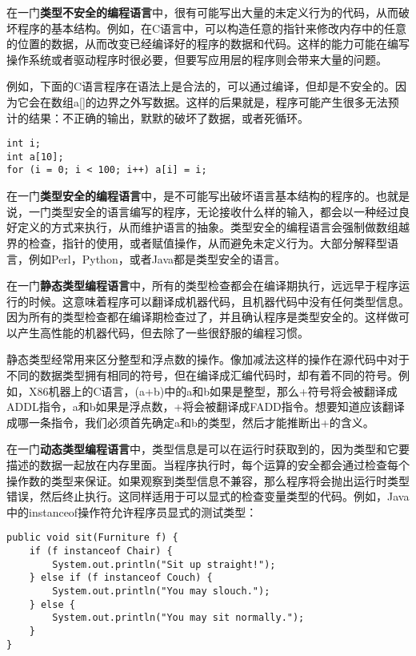 \documentclass[cn,11pt,chinese]{elegantbook}
\begin{document}
在一门\textbf{类型不安全的编程语言}中，很有可能写出大量的未定义行为的代码，从而破坏程序的基本结构。例如，在C语言中，可以构造任意的指针来修改内存中的任意的位置的数据，从而改变已经编译好的程序的数据和代码。这样的能力可能在编写操作系统或者驱动程序时很必要，但要写应用层的程序则会带来大量的问题。

例如，下面的C语言程序在语法上是合法的，可以通过编译，但却是不安全的。因为它会在数组a[]的边界之外写数据。这样的后果就是，程序可能产生很多无法预计的结果：不正确的输出，默默的破坏了数据，或者死循环。

\begin{verbatim}
int i;
int a[10];
for (i = 0; i < 100; i++) a[i] = i;
\end{verbatim}

在一门\textbf{类型安全的编程语言}中，是不可能写出破坏语言基本结构的程序的。也就是说，一门类型安全的语言编写的程序，无论接收什么样的输入，都会以一种经过良好定义的方式来执行，从而维护语言的抽象。类型安全的编程语言会强制做数组越界的检查，指针的使用，或者赋值操作，从而避免未定义行为。大部分解释型语言，例如Perl，Python，或者Java都是类型安全的语言。

在一门\textbf{静态类型编程语言}中，所有的类型检查都会在编译期执行，远远早于程序运行的时候。这意味着程序可以翻译成机器代码，且机器代码中没有任何类型信息。因为所有的类型检查都在编译期检查过了，并且确认程序是类型安全的。这样做可以产生高性能的机器代码，但去除了一些很舒服的编程习惯。

静态类型经常用来区分整型和浮点数的操作。像加减法这样的操作在源代码中对于不同的数据类型拥有相同的符号，但在编译成汇编代码时，却有着不同的符号。例如，X86机器上的C语言，(a+b)中的a和b如果是整型，那么+符号将会被翻译成ADDL指令，a和b如果是浮点数，+将会被翻译成FADD指令。想要知道应该翻译成哪一条指令，我们必须首先确定a和b的类型，然后才能推断出+的含义。

在一门\textbf{动态类型编程语言}中，类型信息是可以在运行时获取到的，因为类型和它要描述的数据一起放在内存里面。当程序执行时，每个运算的安全都会通过检查每个操作数的类型来保证。如果观察到类型信息不兼容，那么程序将会抛出运行时类型错误，然后终止执行。这同样适用于可以显式的检查变量类型的代码。例如，Java中的instanceof操作符允许程序员显式的测试类型：

\begin{verbatim}
public void sit(Furniture f) {
    if (f instanceof Chair) {
        System.out.println("Sit up straight!");
    } else if (f instanceof Couch) {
        System.out.println("You may slouch.");
    } else {
        System.out.println("You may sit normally.");
    }
}
\end{verbatim}
\end{document}
